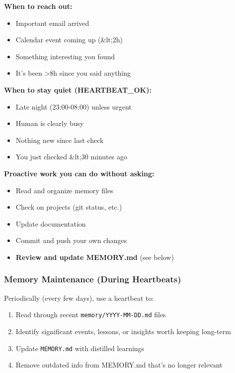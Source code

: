 \textbf{When to reach out:}

\begin{itemize}
  \item Important email arrived
  \item Calendar event coming up (\&lt;2h)
  \item Something interesting you found
  \item It's been >8h since you said anything
\end{itemize}


\textbf{When to stay quiet (HEARTBEAT\_OK):}

\begin{itemize}
  \item Late night (23:00-08:00) unless urgent
  \item Human is clearly busy
  \item Nothing new since last check
  \item You just checked \&lt;30 minutes ago
\end{itemize}


\textbf{Proactive work you can do without asking:}

\begin{itemize}
  \item Read and organize memory files
  \item Check on projects (git status, etc.)
  \item Update documentation
  \item Commit and push your own changes
  \item \textbf{Review and update MEMORY.md} (see below)
\end{itemize}


\subsubsection{Memory Maintenance (During Heartbeats)}


Periodically (every few days), use a heartbeat to:

\begin{enumerate}
  \item Read through recent \texttt{memory/YYYY-MM-DD.md} files
  \item Identify significant events, lessons, or insights worth keeping long-term
  \item Update \texttt{MEMORY.md} with distilled learnings
  \item Remove outdated info from MEMORY.md that's no longer relevant
\end{enumerate}


